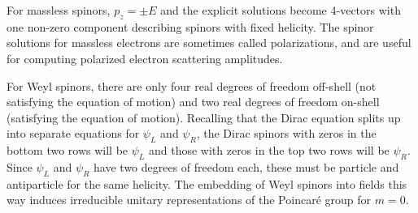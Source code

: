 \documentclass[11pt]{article}
\theoremstyle{definition}
\begin{document}
For massless spinors, \( p_z = \pm E \) and the explicit solutions become 4-vectors with one non-zero component describing spinors with fixed helicity. The spinor solutions for massless electrons are sometimes called polarizations, and are useful for computing polarized electron scattering amplitudes.

For Weyl spinors, there are only four real degrees of freedom off-shell (not satisfying the equation of motion) and two real degrees of freedom on-shell (satisfying the equation of motion). Recalling that the Dirac equation splits up into separate equations for \( \psi_L \) and \( \psi_R \), the Dirac spinors with zeros in the bottom two rows will be \( \psi_L \) and those with zeros in the top two rows will be \( \psi_R \). Since \( \psi_L \) and \( \psi_R \) have two degrees of freedom each, these must be particle and antiparticle for the same helicity. The embedding of Weyl spinors into fields this way induces irreducible unitary representations of the Poincaré group for \( m = 0 \).
\end{document}

